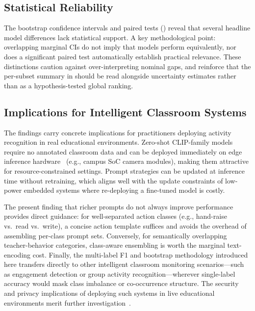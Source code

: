 \documentclass[symmetry,article,submit,pdftex,moreauthors]{Definitions/mdpi}
\begin{document}
\subsection{Statistical Reliability}
\label{sec:discuss_bootstrap}

The bootstrap confidence intervals and paired tests () reveal that several headline model differences lack statistical support. A key methodological point: overlapping marginal CIs do not imply that models perform equivalently, nor does a significant paired test automatically establish practical relevance. These distinctions caution against over-interpreting nominal gaps, and reinforce that the per-subset summary in  should be read alongside uncertainty estimates rather than as a hypothesis-tested global ranking.

\subsection{Implications for Intelligent Classroom Systems}

The findings carry concrete implications for practitioners deploying activity recognition in real educational environments. Zero-shot CLIP-family models require no annotated classroom data and can be deployed immediately on edge inference hardware~\cite{ma2026agentic_ai} (e.g., campus SoC camera modules), making them attractive for resource-constrained settings. Prompt strategies can be updated at inference time without retraining, which aligns well with the update constraints of low-power embedded systems where re-deploying a fine-tuned model is costly.

The present finding that richer prompts do not always improve performance provides direct guidance: for well-separated action classes (e.g., hand-raise vs.\ read vs.\ write), a concise action template suffices and avoids the overhead of assembling per-class prompt sets. Conversely, for semantically overlapping teacher-behavior categories, class-aware ensembling is worth the marginal text-encoding cost. Finally, the multi-label F1 and bootstrap methodology introduced here transfers directly to other intelligent classroom monitoring scenarios---such as engagement detection or group activity recognition---wherever single-label accuracy would mask class imbalance or co-occurrence structure. The security and privacy implications of deploying such systems in live educational environments merit further investigation~\cite{deng2025hardening_llm}.
\end{document}
